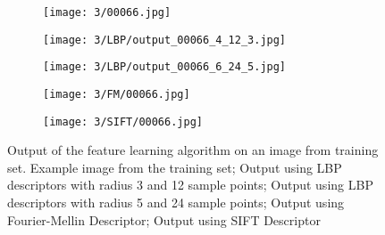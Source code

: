 \documentclass[draft,final]{vutinfth} %
\begin{document}
\begin{figure}[h]
  \centering
  \begin{subfigure}[t]{0.19\columnwidth}
    \centering
    \texttt{[image: 3/00066.jpg]}
    \subcaption{}
    \label{fig:pe:66:orig}
  \end{subfigure}
  \begin{subfigure}[t]{0.19\columnwidth}
    \centering
    \texttt{[image: 3/LBP/output\_00066\_4\_12\_3.jpg]}
    \subcaption{}
    \label{fig:pe:66:LBPs}
  \end{subfigure}
  \begin{subfigure}[t]{0.19\columnwidth}
    \centering
    \texttt{[image: 3/LBP/output\_00066\_6\_24\_5.jpg]}
    \subcaption{}
    \label{fig:pe:66:LBPb}
  \end{subfigure}
  \begin{subfigure}[t]{0.19\columnwidth}
    \centering
    \texttt{[image: 3/FM/00066.jpg]}
    \subcaption{}
    \label{fig:pe:66:FM}
  \end{subfigure}
  \begin{subfigure}[t]{0.19\columnwidth}
    \centering
    \texttt{[image: 3/SIFT/00066.jpg]}
    \subcaption{}
    \label{fig:pe:66:SIFT}
  \end{subfigure}
  \caption{Output of the feature learning algorithm on an image from training set.  Example image from the training set;  Output using LBP descriptors with radius 3 and 12 sample points;  Output using LBP descriptors with radius 5 and 24 sample points;  Output using Fourier-Mellin Descriptor;  Output using SIFT Descriptor}
  \label{fig:pe:66}
\end{figure}
\end{document}
